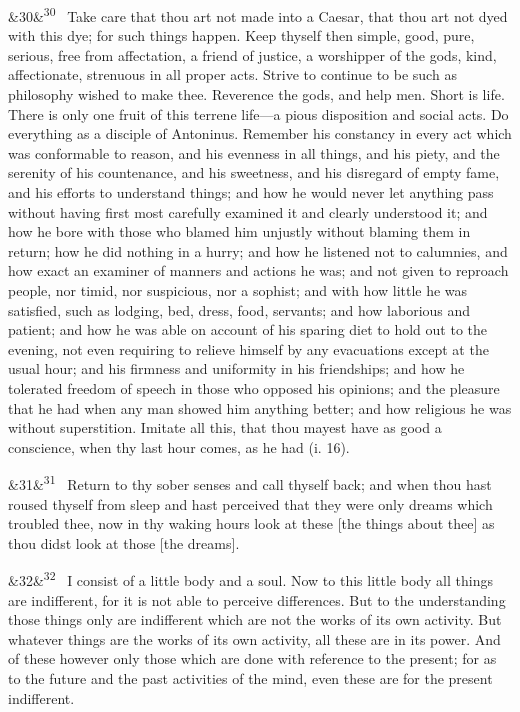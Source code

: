 \documentclass[12pt]{article}
\newcommand{\para}[1][]{\par\noindent\ifx&#1&\else\textsuperscript{\footnotesize #1}~\fi}
\begin{document}
\para[30] Take care that thou art not made into a Caesar, that thou art not
dyed with this dye; for such things happen. Keep thyself then simple,
good, pure, serious, free from affectation, a friend of justice, a
worshipper of the gods, kind, affectionate, strenuous in all proper
acts. Strive to continue to be such as philosophy wished to make thee.
Reverence the gods, and help men. Short is life. There is only one fruit
of this terrene life---a pious disposition and social acts. Do everything
as a disciple of Antoninus. Remember his constancy in every act which
was conformable to reason, and his evenness in all things, and his
piety, and the serenity of his countenance, and his sweetness, and his
disregard of empty fame, and his efforts to understand things; and how
he would never let anything pass without having first most carefully
examined it and clearly understood it; and how he bore with those who
blamed him unjustly without blaming them in return; how he did nothing
in a hurry; and how he listened not to calumnies, and how exact an
examiner of manners and actions he was; and not given to reproach
people, nor timid, nor suspicious, nor a sophist; and with how little he
was satisfied, such as lodging, bed, dress, food, servants; and how
laborious and patient; and how he was able on account of his sparing
diet to hold out to the evening, not even requiring to relieve himself
by any evacuations except at the usual hour; and his firmness and
uniformity in his friendships; and how he tolerated freedom of speech in
those who opposed his opinions; and the pleasure that he had when any
man showed him anything better; and how religious he was without
superstition. Imitate all this, that thou mayest have as good a
conscience, when thy last hour comes, as he had (i. 16).

\para[31] Return to thy sober senses and call thyself back; and when thou hast
roused thyself from sleep and hast perceived that they were only dreams
which troubled thee, now in thy waking hours look at these [the things
about thee] as thou didst look at those [the dreams].

\para[32] I consist of a little body and a soul. Now to this little body all
things are indifferent, for it is not able to perceive differences. But
to the understanding those things only are indifferent which are not the
works of its own activity. But whatever things are the works of its own
activity, all these are in its power. And of these however only those
which are done with reference to the present; for as to the future and
the past activities of the mind, even these are for the present
indifferent.
\end{document}
